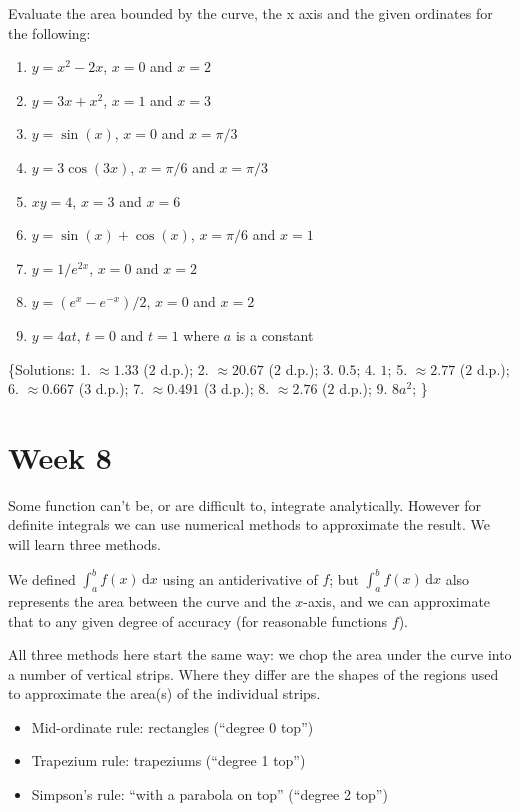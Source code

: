 \documentclass[
  11pt,
  oneside]{book}
\providecommand{\tightlist}{%
  \setlength{\itemsep}{0pt}\setlength{\parskip}{0pt}}
\newcommand{\slide}{}
\theoremstyle{definition}
\theoremstyle{definition}
\theoremstyle{definition}
\theoremstyle{definition}
\theoremstyle{remark}
\begin{document}
Evaluate the area bounded by the curve, the x axis and the given ordinates for the following:

\begin{enumerate}
\def\labelenumi{\arabic{enumi}.}
\tightlist
\item
  \(y=x^2-2x\), \(x=0\) and \(x=2\)
\item
  \(y=3x+x^2\), \(x=1\) and \(x=3\)
\item
  \(y=\sin(x)\), \(x=0\) and \(x=\pi/3\)
\item
  \(y=3\cos(3x)\), \(x=\pi/6\) and \(x=\pi/3\)
\item
  \(xy=4\), \(x=3\) and \(x=6\)
\item
  \(y=\sin(x)+\cos(x)\), \(x=\pi/6\) and \(x=1\)
\item
  \(y=1/e^{2x}\), \(x=0\) and \(x=2\)
\item
  \(y=(e^x-e^{-x})/2\), \(x=0\) and \(x=2\)
\item
  \(y=4at\), \(t=0\) and \(t=1\) where \(a\) is a constant
\end{enumerate}

\{Solutions:
1. \(\approx 1.33\) (\(2\) d.p.);
2. \(\approx 20.67\) (\(2\) d.p.);
3. \(0.5\);
4. \(1\);
5. \(\approx 2.77\) (\(2\) d.p.);
6. \(\approx 0.667\) (\(3\) d.p.);
7. \(\approx 0.491\) (\(3\) d.p.);
8. \(\approx 2.76\) (\(2\) d.p.);
9. \(8a^2\);
\}

\chapter{Week 8}\label{week-eight}

Some function can't be, or are difficult to, integrate analytically. However for definite integrals we can use numerical methods to approximate the result. We will learn three methods.

\slide

We defined \(\displaystyle\int_a^bf(x)\,\mathrm{d}x\) using an antiderivative of \(f\); but \(\displaystyle\int_a^bf(x)\,\mathrm{d}x\) also represents the area between the curve and the \(x\)-axis, and we can approximate that to any given degree of accuracy (for reasonable functions \(f\)).

All three methods here start the same way: we chop the area under the curve into a number of vertical strips. Where they differ are the shapes of the regions used to approximate the area(s) of the individual strips.

\begin{itemize}
\tightlist
\item
  Mid-ordinate rule: rectangles (``degree 0 top'')
\item
  Trapezium rule: trapeziums (``degree 1 top'')
\item
  Simpson's rule: ``with a parabola on top'' (``degree 2 top'')
\end{itemize}
\end{document}
